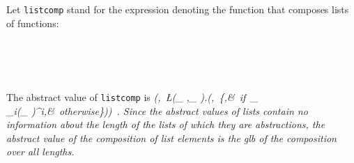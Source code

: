 \documentclass[11pt]{article}
\begin{document}
Let \mbox{\tt listcomp} stand for the expression denoting the function
that composes lists of functions:
\begin{flushleft}
\vspace{-0.0em}\vspace{-0.0em}\\
\vspace{-0.0em}\\
\vspace{-0.0em}\\
\vspace{-0.0em}
\end{flushleft}
The abstract value of \mbox{\tt listcomp} is
\beqs
\it (\ID,\ \L(\A_{ },\K_{ }).(\ID,\ \left\{\bot,&\it \mbox{\rm\ if}\ \A_{ }\neq\SPINE\ \ID\\
\it \glb_{i}(\K_{ })^i,&\it \mbox{\rm\ otherwise}\ea\right\}))\ .
\eeqs
Since the abstract values of lists contain no information about the
length of the lists of which they are abstractions, the abstract value
of the composition of list elements is the glb of the composition over
all lengths.
\end{document}
